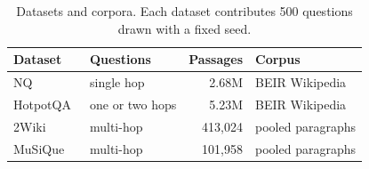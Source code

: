 \begin{table}[t]
\centering\footnotesize
\setlength{\tabcolsep}{4pt}
\caption{Datasets and corpora. Each dataset contributes 500 questions drawn with a fixed seed.}
\label{tab:data}
\begin{tabular*}{\linewidth}{@{\extracolsep{\fill}}llrl@{}}
\toprule
Dataset & Questions & Passages & Corpus \\
\midrule
NQ~\cite{kwiatkowski2019nq,lee2019orqa} & single hop & 2.68M & BEIR Wikipedia~\cite{thakur2021beir} \\
HotpotQA~\cite{yang2018hotpotqa} & one or two hops & 5.23M & BEIR Wikipedia~\cite{thakur2021beir} \\
2Wiki~\cite{ho2020twowiki} & multi-hop & 413,024 & pooled paragraphs \\
MuSiQue~\cite{trivedi2022musique} & multi-hop & 101,958 & pooled paragraphs \\
\bottomrule
\end{tabular*}
\end{table}
